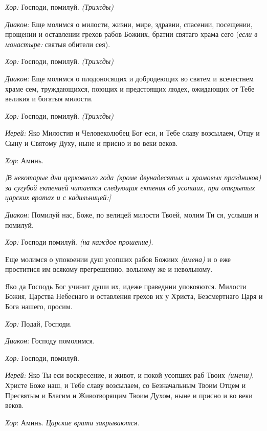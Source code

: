 \begin{mymulticols}
{\itshape Хор:} Господи, помилуй. {\itshape (Трижды)} 

{\itshape Диакон:} Еще молимся о милости, жизни, мире, здравии, спасении, посещении, прощении и оставлении грехов рабов Божиих, братии святаго храма сего ({\itshape если в монастыре:} святыя обители сея). 

{\itshape Хор:} Господи, помилуй. {\itshape (Трижды)} 

{\itshape Диакон:} Еще молимся о плодоносящих и добродеющих во святем и всечестнем храме сем, труждающихся, поющих и предстоящих людех, ожидающих от Тебе великия и богатыя милости.

{\itshape Хор:} Господи, помилуй. {\itshape (Трижды)} 

{\itshape Иерей:} Яко Милостив и Человеколюбец Бог еси, и Тебе славу возсылаем, Отцу и Сыну и Святому Духу, ныне и присно и во веки веков.


{\itshape Хор}: Аминь.


{\itshape [В некоторые дни церковного года (кроме двунадесятых и храмовых праздников) за сугубой ектенией читается следующая ектения об усопших, при открытых царских вратах и с кадильницей:]}




{\itshape Диакон:} Помилуй нас, Боже, по велицей милости Твоей, молим Ти ся, услыши и помилуй.


 {\itshape Хор:} Господи помилуй. {\itshape (на каждое прошение)}. 


Еще молимся о упокоении душ усопших рабов Божиих {\itshape (имена)} и о еже проститися им всякому прегрешению, вольному же и невольному.


Яко да Господь Бог учинит души их, идеже праведнии упокояются. Милости Божия, Царства Небеснаго и оставления грехов их у Христа, Безсмертнаго Царя и Бога нашего, просим.


{\itshape Хор:} Подай, Господи.


{\itshape Диакон:} Господу помолимся.


{\itshape Хор:} Господи, помилуй.


{\itshape Иерей:} Яко Ты еси воскресение, и живот, и покой усопших раб Твоих {\itshape (имени)}, Христе Боже наш, и Тебе славу возсылаем, со Безначальным Твоим Отцем и Пресвятым и Благим и Животворящим Твоим Духом, ныне и присно и во веки веков.


{\itshape Хор}: Аминь. {\itshape Царские врата закрываются.}





\end{mymulticols}
